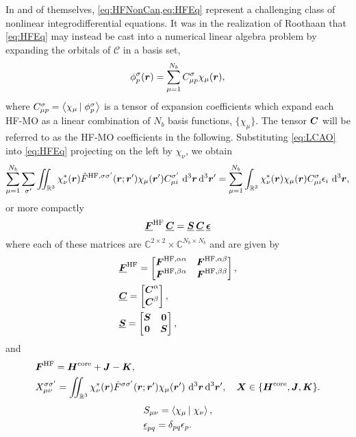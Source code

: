 In and of themselves, \cref{eq:HFNonCan,eq:HFEq} represent a challenging class of nonlinear integrodifferential equations. It was in the
realization of Roothaan  that \cref{eq:HFEq} may instead be cast into a numerical linear algebra problem by expanding the
orbitals of $\mathcal{C}$ in a basis set,
\begin{equation}
\label{eq:LCAO}
\phi^\sigma_p(\boldsymbol{r}) = \sum_{\mu = 1}^{N_b} C^\sigma_{\mu p} \chi_\mu(\boldsymbol{r}),
\end{equation}
where $C^\sigma_{\mu p} = \left\langle \chi_\mu \left\vert\right. \phi^\sigma_p \right\rangle$ is a tensor of expansion coefficients which expand each HF-MO as a linear 
combination of $N_b$ basis functions, $\{\chi_\mu\}$. The tensor $\boldsymbol{C}$ will be referred to as the HF-MO coefficients in the following.
Substituting \cref{eq:LCAO} into \cref{eq:HFEq} projecting on the left by $\chi_\nu$, we obtain
\begin{equation}
 \sum_{\mu = 1}^{N_b} \sum_{\sigma'} \int\mkern-12mu\int_{\mathbb R^3} \chi^*_\nu(\boldsymbol{r}) \hat{F}^{\mathrm{HF},\sigma\sigma'}(\boldsymbol{r}; \boldsymbol{r}') \chi_\mu(\boldsymbol{r}') C_{\mu i}^{\sigma'}  
   \,\,\mathrm{d}^3\boldsymbol{r}\,\mathrm{d}^3\boldsymbol{r}' = \sum_{\mu = 1}^{N_b} \int_{\mathbb R^3} \chi^*_\nu(\boldsymbol{r}) \chi_\mu(\boldsymbol{r}) C_{\mu i}^\sigma \epsilon_i \,\,\mathrm{d}^3\boldsymbol{r},
\end{equation}
or more compactly
\begin{equation}
\boldsymbol{\underline{F}}^{\mathrm{HF}} \,\boldsymbol{\underline{C}} = \boldsymbol{\underline{S}}\, \boldsymbol{\underline{C}}\, \boldsymbol{\underline{\epsilon}}
\end{equation}
where each of these matrices are $\mathbb C^{2\times 2} \times \mathbb C^{N_b\times N_b} $ and are given by
\begin{align}
&\boldsymbol{\underline{F}}^{\mathrm{HF}} = \begin{bmatrix} \boldsymbol{F}^{\mathrm{HF},{\alpha\alpha}} & \boldsymbol{F}^{\mathrm{HF},{\alpha\beta}} \\ \boldsymbol{F}^{\mathrm{HF},{\beta\alpha}} & \boldsymbol{F}^{\mathrm{HF},{\beta\beta}} \end{bmatrix}, \\
&\boldsymbol{\underline{C}} = \begin{bmatrix} \boldsymbol{C}^\alpha \\ \boldsymbol{C}^\beta \end{bmatrix},\\
&\boldsymbol{\underline{S}} = \begin{bmatrix} \boldsymbol{S} & \boldsymbol{0} \\ \boldsymbol{0} & \boldsymbol{S} \end{bmatrix},
\end{align}
and
\begin{subequations}
\begin{align}
&\boldsymbol{F}^{\mathrm{HF}}=  \boldsymbol{H}^{\mathrm{core}} + \boldsymbol{J} - \boldsymbol{K}, \\ 
&X_{\mu\nu}^{\sigma\sigma'} =  \int\mkern-12mu\int_{\mathbb R^3} \chi^*_\nu(\boldsymbol{r}) \hat{F}^{\sigma\sigma'}(\boldsymbol{r}; \boldsymbol{r}') \chi_\mu(\boldsymbol{r}')\,\,\mathrm{d}^3\boldsymbol{r}\,\mathrm{d}^3\boldsymbol{r}',
\quad \boldsymbol{X} \in \{ \boldsymbol{H}^{\mathrm{core}} , \boldsymbol{J} , \boldsymbol{K} \}.
\end{align}
\end{subequations}
\begin{align}
&S_{\mu\nu} = \left\langle \chi_\mu \left\vert\right. \chi_\nu \right\rangle, \\
&\underline{\epsilon}_{pq} = \delta_{pq} \epsilon_p.
\end{align}








